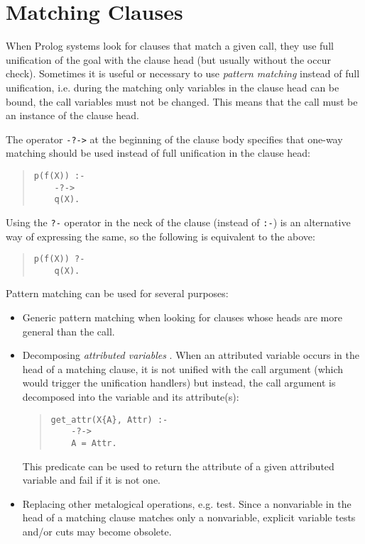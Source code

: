 \section{Matching Clauses}
\label{matching}

When Prolog systems look for clauses that match a given call,
they use full unification of the goal with the clause head
(but usually without the occur check).
Sometimes it is useful or necessary to use {\it pattern matching}
instead of full unification, i.e. during the matching
only variables in the clause head can be bound, the call
variables must not be changed.
This means that the call must be an instance of the
clause head.

The operator \verb.-?->. at the beginning of the clause
body specifies that one-way matching should be used
instead of full unification in the clause head:
\begin{quote}
\begin{verbatim}
p(f(X)) :-
    -?->
    q(X).
\end{verbatim}
\end{quote}
Using the \verb.?-. operator in the neck of the clause (instead of
\verb.:-.) is an alternative way of expressing the same, so the following
is equivalent to the above:
\begin{quote}
\begin{verbatim}
p(f(X)) ?-
    q(X).
\end{verbatim}
\end{quote}
Pattern matching can be used for several purposes:
\begin{itemize}
\item Generic pattern matching when looking for clauses
whose heads are more general than the call.

\item Decomposing {\it attributed variables} \cite{eclipseext}.
When an attributed variable occurs in the head of a matching clause,
it is not unified with the call argument (which would trigger
the unification handlers) but instead, the call argument
is decomposed into the variable and its attribute(s):
\begin{quote}
\begin{verbatim}
get_attr(X{A}, Attr) :-
    -?->
    A = Attr.
\end{verbatim}
\end{quote}
This predicate can be used to return the attribute of a given
attributed variable and fail if it is not one.

\item Replacing other metalogical operations, e.g. 
test. Since a nonvariable in the head of a matching clause
matches only a nonvariable, explicit variable tests and/or cuts
may become obsolete.
\end{itemize}

